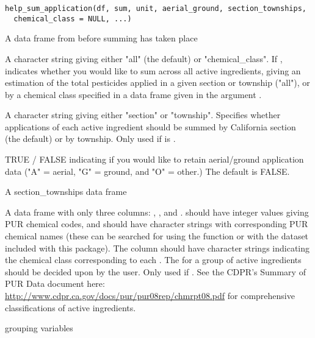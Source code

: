 \documentclass[a4paper]{book}
\begin{document}
%
\begin{Usage}
\begin{verbatim}
help_sum_application(df, sum, unit, aerial_ground, section_townships,
  chemical_class = NULL, ...)
\end{verbatim}
\end{Usage}
%
\begin{Arguments}
\begin{ldescription}
\item[\code{df}] A data frame from  before summing has taken
place

\item[\code{sum}] A character string giving either "all" (the
default) or "chemical\_class". If ,
 indicates whether you would like to sum across all active
ingredients, giving an estimation of the total pesticides applied in a
given section or township ("all"), or by a chemical class specified in a
data frame given in the argument .

\item[\code{unit}] A character string giving either "section" or "township".
Specifies whether applications of each active ingredient should be summed
by California section (the default) or by township. Only used if
 is .

\item[\code{aerial\_ground}] TRUE / FALSE indicating if you would like to
retain aerial/ground application data ("A" = aerial, "G" = ground, and
"O" = other.) The default is FALSE.

\item[\code{section\_townships}] A section\_townships data frame

\item[\code{chemical\_class}] A data frame with only three columns: ,
, and .  should have
integer values giving PUR chemical codes, and  should have
character strings with corresponding PUR chemical names (these can be
searched for using the  function or with the
 dataset included with this package). The
 column should have character strings indicating the
chemical class corresponding to each . The
 for a group of active ingredients should be decided
upon by the user. Only used if . See
the CDPR's Summary of PUR Data document here:
\url{http://www.cdpr.ca.gov/docs/pur/pur08rep/chmrpt08.pdf} for
comprehensive classifications of active ingredients.

\item[\code{...}] grouping variables
\end{ldescription}
\end{Arguments}
\end{document}
